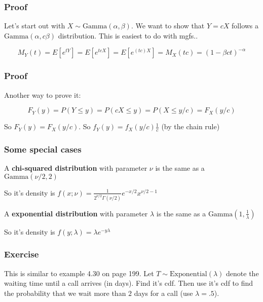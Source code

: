 \documentclass{beamer}
\begin{document}

\begin{frame}
\frametitle{Proof}

Let's start out with $X \sim \text{Gamma}(\alpha, \beta)$. We want to show that $Y = cX$ follows a $\text{Gamma}(\alpha, c\beta)$ distribution. This is easiest to do with mgfs..
\newline

\[
M_Y(t) = E[e^{tY}] = E[e^{tcX}] = E[e^{(tc)X}] = M_X(tc) = (1 - \beta c t)^{-\alpha}
\]


\end{frame}


\begin{frame}
\frametitle{Proof}

Another way to prove it:

\[
F_Y(y) = P(Y \le y) = P(cX \le y) = P(X \le y/c) = F_X(y/c)
\]

So $F_Y(y) = F_X(y/c)$. 
\newline
So $f_Y(y) = f_X(y/c) \frac{1}{c}$ (by the chain rule)


\end{frame}


\begin{frame}
\frametitle{Some special cases}

A \textbf{chi-squared distribution} with parameter $\nu$ is the same as a $\text{Gamma}(\nu/2, 2)$

So it's density is $f(x; \nu) = \frac{1}{2^{\nu/2} \Gamma(\nu/2)} e^{-x/2} x^{\nu/2 - 1}$
\newline

A \textbf{exponential distribution} with parameter $\lambda$ is the same as a $\text{Gamma}(1, \frac{1}{\lambda})$

So it's density is $f(y;\lambda) = \lambda e^{-y\lambda}$
\end{frame}


\begin{frame}
\frametitle{Exercise}

This is similar to example 4.30 on page 199. Let $T \sim \text{Exponential}(\lambda)$ denote the waiting time until a call arrives (in days). Find it's cdf. Then use it's cdf to find the probability that we wait more than $2$ days for a call (use $\lambda = .5$).


\end{frame}
\end{document}
